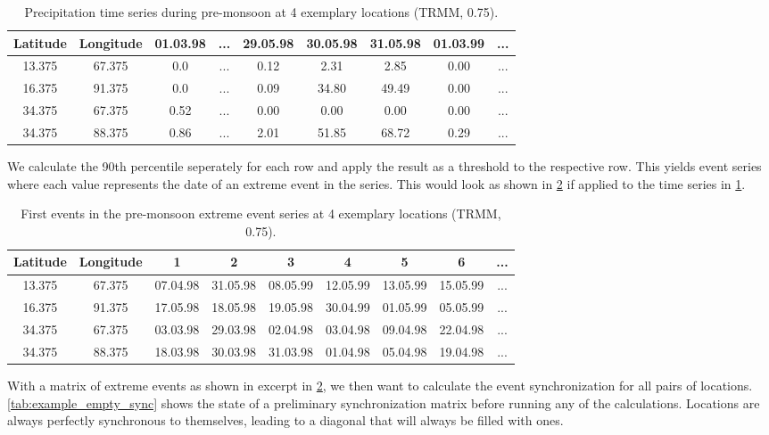 \begin{table}[h]
  \centering
  \begin{tabular}{ |c|c|ccccccc| }
    \hline
    Latitude & Longitude & 01.03.98 & ... & 29.05.98 & 30.05.98 & 31.05.98 & 01.03.99 & ...\\
    \hline
    13.375 & 67.375 & 0.0  & ... & 0.12 & 2.31  & 2.85  & 0.00 & ... \\
    16.375 & 91.375 & 0.0  & ... & 0.09 & 34.80 & 49.49 & 0.00 & ... \\
    34.375 & 67.375 & 0.52 & ... & 0.00 & 0.00  & 0.00  & 0.00 & ... \\
    34.375 & 88.375 & 0.86 & ... & 2.01 & 51.85 & 68.72 & 0.29 & ... \\
    \hline
  \end{tabular}
  \caption{Precipitation time series during pre-monsoon at 4 exemplary locations (TRMM, 0.75\degree).}
  \label{tab:example_rainfall_ts}
\end{table}

We calculate the 90th percentile seperately for each row and apply the result as a threshold to the respective row. This yields event series where each value represents the date of an extreme event in the series. This would look as shown in \cref{tab:example_rainfall_events} if applied to the time series in \cref{tab:example_rainfall_ts}.

\begin{table}[h]
  \centering
  \begin{tabular}{ |c|c|ccccccc| }
    \hline
    Latitude & Longitude & 1 & 2 & 3 & 4 & 5 & 6 & ... \\
    \hline
    13.375 & 67.375 & 07.04.98 & 31.05.98 & 08.05.99 & 12.05.99 & 13.05.99 & 15.05.99 & ... \\
    16.375 & 91.375 & 17.05.98 & 18.05.98 & 19.05.98 & 30.04.99 & 01.05.99 & 05.05.99 & ... \\
    34.375 & 67.375 & 03.03.98 & 29.03.98 & 02.04.98 & 03.04.98 & 09.04.98 & 22.04.98 & ... \\
    34.375 & 88.375 & 18.03.98 & 30.03.98 & 31.03.98 & 01.04.98 & 05.04.98 & 19.04.98 & ... \\
    \hline
  \end{tabular}
  \caption{First events in the pre-monsoon extreme event series at 4 exemplary locations (TRMM, 0.75\degree).}
  \label{tab:example_rainfall_events}
\end{table}

With a matrix of extreme events as shown in excerpt in \cref{tab:example_rainfall_events}, we then want to calculate the event synchronization for all pairs of locations. \cref{tab:example_empty_sync} shows the state of a preliminary synchronization matrix before running any of the calculations. Locations are always perfectly synchronous to themselves, leading to a diagonal that will always be filled with ones.

